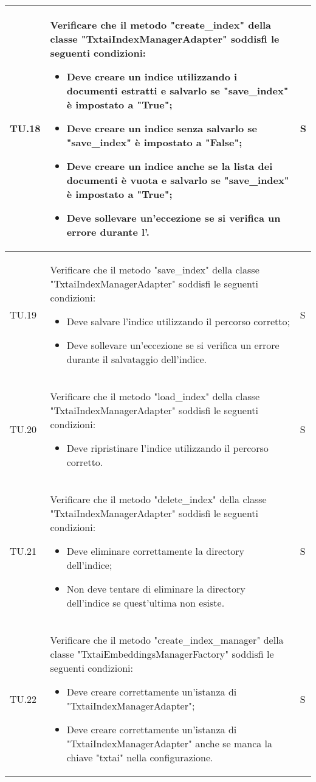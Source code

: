 \begin{adjustwidth}{-0.5cm}{-0.5cm}
\begin{longtable}{|P{1.5cm}|>{\raggedright}P{9.5cm}|>{\arraybackslash}P{1.5cm}|}
		\hline TU.18 & Verificare che il metodo "create\_index" della classe "TxtaiIndexManagerAdapter" soddisfi le seguenti condizioni:
		\begin{itemize}
			\item Deve creare un indice utilizzando i documenti estratti e salvarlo se "save\_index" è impostato a "True";
			\item Deve creare un indice senza salvarlo se "save\_index" è impostato a "False";
			\item Deve creare un indice anche se la lista dei documenti è vuota e salvarlo se "save\_index" è impostato a "True";
			\item Deve sollevare un'eccezione se si verifica un errore durante l'.
		\end{itemize} & S \\

		\hline TU.19 & Verificare che il metodo "save\_index" della classe "TxtaiIndexManagerAdapter" soddisfi le seguenti condizioni:
		\begin{itemize}
			\item Deve salvare l'indice utilizzando il percorso corretto;
			\item Deve sollevare un'eccezione se si verifica un errore durante il salvataggio dell'indice.
		\end{itemize} & S \\

		\hline TU.20 & Verificare che il metodo "load\_index" della classe "TxtaiIndexManagerAdapter" soddisfi le seguenti condizioni:
		\begin{itemize}
			\item Deve ripristinare l'indice utilizzando il percorso corretto.
		\end{itemize} & S \\

		\hline TU.21 & Verificare che il metodo "delete\_index" della classe "TxtaiIndexManagerAdapter" soddisfi le seguenti condizioni:
		\begin{itemize}
			\item Deve eliminare correttamente la directory dell'indice;
			\item Non deve tentare di eliminare la directory dell'indice se quest'ultima non esiste.
		\end{itemize} & S \\

		\hline TU.22 & Verificare che il metodo "create\_index\_manager" della classe "TxtaiEmbeddingsManagerFactory" soddisfi le seguenti condizioni:
		\begin{itemize}
			\item Deve creare correttamente un'istanza di "TxtaiIndexManagerAdapter";
			\item Deve creare correttamente un'istanza di "TxtaiIndexManagerAdapter" anche se manca la chiave "txtai" nella configurazione.
		\end{itemize} & S \\


\end{longtable}
\end{adjustwidth}
